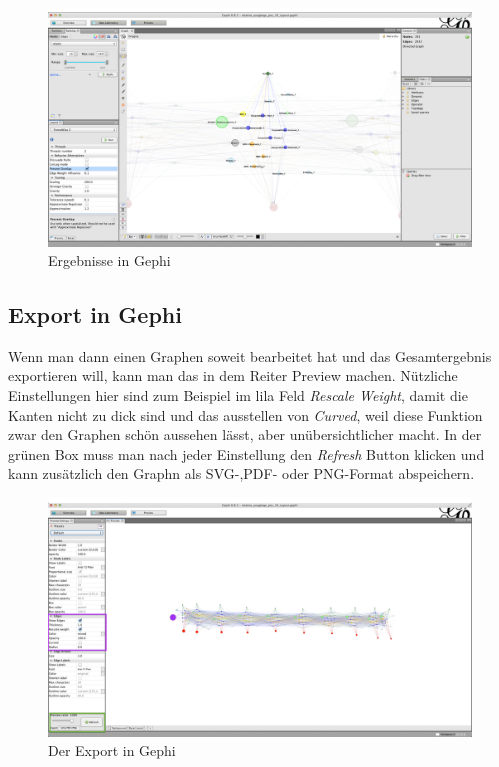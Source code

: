 \begin{figure}[H]
    \centering
    \includegraphics[scale=0.25]{ergebnis_gephi.png}
    \caption[ergebnis]{Ergebnisse in Gephi}
    \label{ergebnis}
\end{figure}


\subsection*{Export in Gephi}
Wenn man dann einen Graphen soweit bearbeitet hat und das Gesamtergebnis exportieren will, kann man das in dem Reiter Preview machen. Nützliche Einstellungen hier sind zum Beispiel im lila Feld \textit{Rescale Weight}, damit die Kanten nicht zu dick sind und das ausstellen von \textit{Curved}, weil diese Funktion zwar den Graphen schön aussehen lässt, aber unübersichtlicher macht. In der grünen Box muss man nach jeder Einstellung den \textit{Refresh} Button klicken und kann zusätzlich den Graphn als SVG-,PDF- oder PNG-Format abspeichern.

\begin{figure}[H]
    \centering
    \includegraphics[scale=0.25]{Preview.png}
    \caption[export]{Der Export in Gephi}
    \label{export}
\end{figure}



